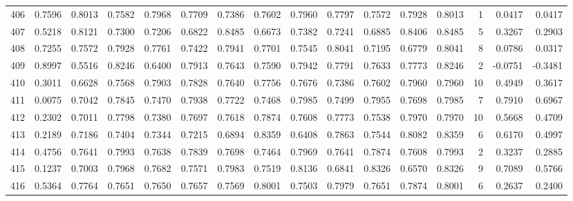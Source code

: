\begin{tabular}{lrrrrrrrrrrrrrrr}
406 &      0.7596 &  0.8013 &  0.7582 &  0.7968 &  0.7709 &  0.7386 &  0.7602 &  0.7960 &  0.7797 &  0.7572 &   0.7928 &     0.8013 &      1 &                    0.0417 &                     0.0417 \\
407 &      0.5218 &  0.8121 &  0.7300 &  0.7206 &  0.6822 &  0.8485 &  0.6673 &  0.7382 &  0.7241 &  0.6885 &   0.8406 &     0.8485 &      5 &                    0.3267 &                     0.2903 \\
408 &      0.7255 &  0.7572 &  0.7928 &  0.7761 &  0.7422 &  0.7941 &  0.7701 &  0.7545 &  0.8041 &  0.7195 &   0.6779 &     0.8041 &      8 &                    0.0786 &                     0.0317 \\
409 &      0.8997 &  0.5516 &  0.8246 &  0.6400 &  0.7913 &  0.7643 &  0.7590 &  0.7942 &  0.7791 &  0.7633 &   0.7773 &     0.8246 &      2 &                   -0.0751 &                    -0.3481 \\
410 &      0.3011 &  0.6628 &  0.7568 &  0.7903 &  0.7828 &  0.7640 &  0.7756 &  0.7676 &  0.7386 &  0.7602 &   0.7960 &     0.7960 &     10 &                    0.4949 &                     0.3617 \\
411 &      0.0075 &  0.7042 &  0.7845 &  0.7470 &  0.7938 &  0.7722 &  0.7468 &  0.7985 &  0.7499 &  0.7955 &   0.7698 &     0.7985 &      7 &                    0.7910 &                     0.6967 \\
412 &      0.2302 &  0.7011 &  0.7798 &  0.7380 &  0.7697 &  0.7618 &  0.7874 &  0.7608 &  0.7773 &  0.7538 &   0.7970 &     0.7970 &     10 &                    0.5668 &                     0.4709 \\
413 &      0.2189 &  0.7186 &  0.7404 &  0.7344 &  0.7215 &  0.6894 &  0.8359 &  0.6408 &  0.7863 &  0.7544 &   0.8082 &     0.8359 &      6 &                    0.6170 &                     0.4997 \\
414 &      0.4756 &  0.7641 &  0.7993 &  0.7638 &  0.7839 &  0.7698 &  0.7464 &  0.7969 &  0.7641 &  0.7874 &   0.7608 &     0.7993 &      2 &                    0.3237 &                     0.2885 \\
415 &      0.1237 &  0.7003 &  0.7968 &  0.7682 &  0.7571 &  0.7983 &  0.7519 &  0.8136 &  0.6841 &  0.8326 &   0.6570 &     0.8326 &      9 &                    0.7089 &                     0.5766 \\
416 &      0.5364 &  0.7764 &  0.7651 &  0.7650 &  0.7657 &  0.7569 &  0.8001 &  0.7503 &  0.7979 &  0.7651 &   0.7874 &     0.8001 &      6 &                    0.2637 &                     0.2400 \\

\end{tabular}
